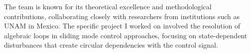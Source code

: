 The team is known for its theoretical excellence and methodological contributions, collaborating closely with researchers from institutions such as UNAM in Mexico. The specific project I worked on involved the resolution of algebraic loops in sliding mode control approaches, focusing on state-dependent disturbances that create circular dependencies with the control signal.
